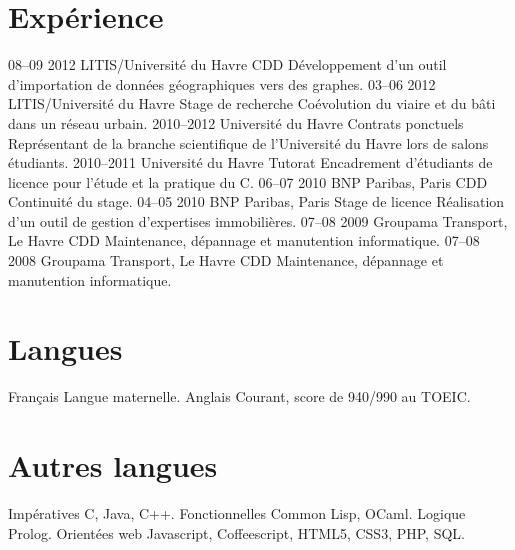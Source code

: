 \documentclass[]{friggeri-cv}
\begin{document}
\section{Expérience}

\begin{entrylist}
  \entry
    {08–09 2012}
    {LITIS/Université du Havre}
    {CDD}
    {Développement d'un outil d'importation de données géographiques vers des graphes.}
  \entry
    {03–06 2012}
    {LITIS/Université du Havre}
    {Stage de recherche}
    {Coévolution du viaire et du bâti dans un réseau urbain.}
  \entry
    {2010–2012}
    {Université du Havre}
    {Contrats ponctuels}
    {Représentant de la branche scientifique de l'Université du Havre
      lors de salons étudiants.}
  \entry
    {2010–2011}
    {Université du Havre}
    {Tutorat}
    {Encadrement d'étudiants de licence pour l'étude et la pratique du
    C.}
  \entry
    {06–07 2010}
    {BNP Paribas, Paris}
    {CDD}
    {Continuité du stage.}
  \entry
    {04–05 2010}
    {BNP Paribas, Paris}
    {Stage de licence}
    {Réalisation d'un outil de gestion d'expertises immobilières.}
  \entry
    {07–08 2009}
    {Groupama Transport, Le Havre}
    {CDD}
    {Maintenance, dépannage et manutention informatique.}
  \entry
    {07–08 2008}
    {Groupama Transport, Le Havre}
    {CDD}
    {Maintenance, dépannage et manutention informatique.}
\end{entrylist}

\newpage

\section{Langues}

\begin{entrylist}
  \entry
    {}
    {Français}
    {}
    {Langue maternelle.}
  \entry
    {}
    {Anglais}
    {}
    {Courant, score de 940/990 au TOEIC.}
\end{entrylist}

\section{Autres langues}

\begin{entrylist}
  \entry
    {}
    {Impératives}
    {}
    {C, Java, C++.}
  \entry
    {}
    {Fonctionnelles}
    {}
    {Common Lisp, OCaml.}
  \entry
    {}
    {Logique}
    {}
    {Prolog.}
  \entry
    {}
    {Orientées web}
    {}
    {Javascript, Coffeescript, HTML5, CSS3, PHP, SQL.}
\end{entrylist}
\end{document}
